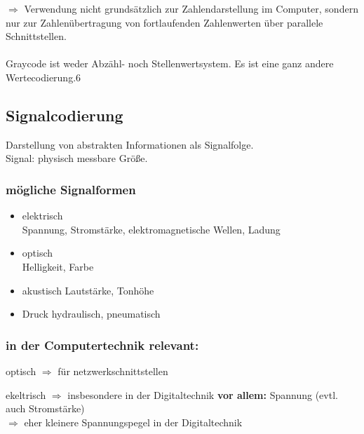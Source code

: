 \documentclass[10pt,a4paper]{scrartcl}
\begin{document}
\noindent
$\Rightarrow$ Verwendung nicht grundsätzlich zur Zahlendarstellung im Computer, sondern nur zur Zahlenübertragung von fortlaufenden Zahlenwerten über parallele Schnittstellen.\\
\\
Graycode ist weder Abzähl- noch Stellenwertsystem. Es ist eine ganz andere Wertecodierung.6

\newpage
\subsection{Signalcodierung}

\begin{Theorem}{}{}
	Darstellung von abstrakten Informationen als Signalfolge. \\
	Signal: physisch messbare Größe.
\end{Theorem}

\subsubsection{mögliche Signalformen}
\begin{itemize}
	\renewcommand\labelitemi{--}
	
	\item elektrisch\\
		Spannung, Stromstärke, elektromagnetische Wellen, Ladung
	\item optisch\\
		Helligkeit, Farbe
	\item akustisch
		Lautstärke, Tonhöhe
	\item Druck
		hydraulisch, pneumatisch
\end{itemize}

\subsubsection*{in der Computertechnik relevant:}

\begin{list}{}{}
	\item[] optisch $\Rightarrow$ für netzwerkschnittstellen
	\item ekeltrisch $\Rightarrow$ insbesondere in der Digitaltechnik
	\subitem \textbf{vor allem:} Spannung (evtl. auch Stromstärke)\\
	\hspace*{2em}$\Rightarrow$ eher kleinere Spannungspegel in der Digitaltechnik
\end{list}
\end{document}
